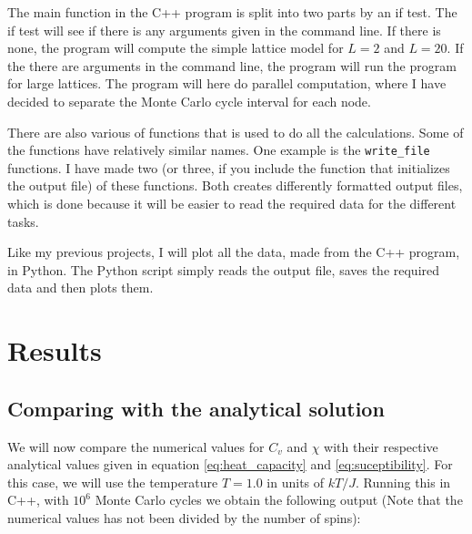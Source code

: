 \documentclass[12pt]{article}
\begin{document}
The main function in the C++ program is split into two parts by an if test. The if test will see if there is any arguments given in the command line. If there is none, the program will compute the simple lattice model for $L = 2$ and $L = 20$. If the there are arguments in the command line, the program will run the program for large lattices. The program will here do parallel computation, where I have decided to separate the Monte Carlo cycle interval for each node. 

There are also various of functions that is used to do all the calculations. Some of the functions have relatively similar names. One example is the \texttt{write\_file} functions. I have made two (or three, if you include the function that initializes the output file) of these functions. Both creates differently formatted output files, which is done because it will be easier to read the required data for the different tasks. 

Like my previous projects, I will plot all the data, made from the C++ program, in Python. The Python script simply reads the output file, saves the required data and then plots them.
\section{Results} \label{section:result}
\subsection*{Comparing with the analytical solution}
We will now compare the numerical values for $C_v$ and $\chi$ with their respective analytical values given in equation \ref{eq:heat_capacity} and \ref{eq:suceptibility}. For this case, we will use the temperature $T = 1.0$ in units of $kT/J$. Running this in C++, with $10^6$ Monte Carlo cycles we obtain the following output (Note that the numerical values has not been divided by the number of spins):
\end{document}
